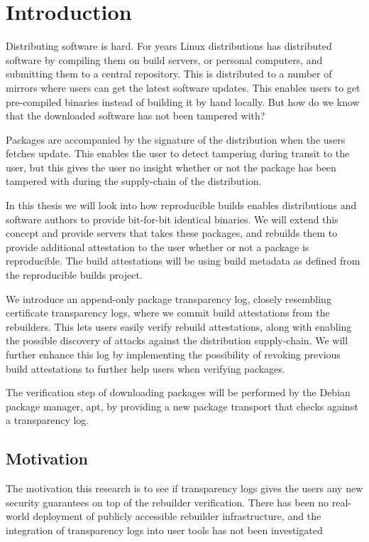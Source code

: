 \documentclass[../Main/thesis.tex]{subfiles}
\begin{document}
\chapter{Introduction}\label{ch:introduction}
Distributing software is hard. For years Linux distributions has distributed
software by compiling them on build servers, or personal computers, and
submitting them to a central repository. This is distributed to a number of
mirrors where users can get the latest software updates. This enables users to
get pre-compiled binaries instead of building it by hand locally. But how do we
know that the downloaded software has not been tampered with?

Packages are accompanied by the signature of the distribution when the users
fetches update. This enables the user to detect tampering during transit to the
user, but this gives the user no insight whether or not the package has been
tampered with during the supply-chain of the distribution.

In this thesis we will look into how reproducible builds enables distributions
and software authors to provide bit-for-bit identical binaries. We will extend
this concept and provide servers that takes these packages, and rebuilds them to
provide additional attestation to the user whether or not a package is
reproducible. The build attestations will be using build metadata as defined
from the reproducible builds project.

We introduce an append-only package transparency log, closely resembling
certificate transparency logs, where we commit build attestations from the
rebuilders. This lets users easily verify rebuild attestations, along with
enabling the possible discovery of attacks against the distribution
supply-chain. We will further enhance this log by implementing the possibility
of revoking previous build attestations to further help users when verifying
packages.

The verification step of downloading packages will be performed by the Debian
package manager, apt, by providing a new package transport that checks against a
transparency log.

\section{Motivation}\label{sec:motivation}
The motivation this research is to see if transparency logs gives the users any
new security guarantees on top of the rebuilder verification. There has been no
real-world deployment of publicly accessible rebuilder infrastructure, and the
integration of transparency logs into user tools has not been investigated 
\end{document}

